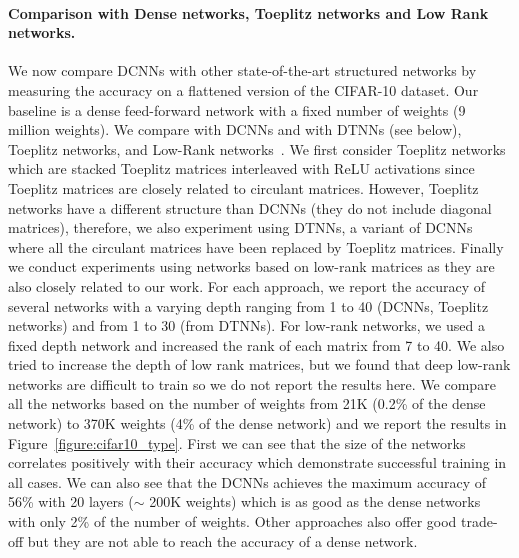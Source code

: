 \paragraph{Comparison with Dense networks, Toeplitz networks and Low Rank networks.}
We now compare DCNNs with other state-of-the-art structured networks by measuring the accuracy on a flattened version of the CIFAR-10 dataset.
Our baseline is a dense feed-forward network with a fixed number of weights (9 million weights).
We compare with DCNNs and with DTNNs (see below), Toeplitz networks, and Low-Rank networks~\cite{8099498}.
We first consider Toeplitz networks which are stacked Toeplitz matrices interleaved with ReLU activations since Toeplitz matrices are closely related to circulant matrices.
However, Toeplitz networks have a different structure than DCNNs (they do not include diagonal matrices), therefore, we also experiment using DTNNs, a variant of DCNNs where all the circulant matrices have been replaced by Toeplitz matrices.
Finally we conduct experiments using networks based on low-rank matrices as they are also closely related to our work.
For each approach, we report the accuracy of several networks with a varying depth ranging from 1 to 40 (DCNNs, Toeplitz networks) and from 1 to 30 (from DTNNs).
For low-rank networks, we used a fixed depth network and increased the rank of each matrix from 7 to 40.
We also tried to increase the depth of low rank matrices, but we found that deep low-rank networks are difficult to train so we do not report the results here.
We compare all the networks based on the number of weights from 21K (0.2\% of the dense network) to 370K weights (4\% of the dense network) and we report the results in Figure~\ref{figure:cifar10_type}. 
First we can see that the size of the networks correlates positively with their accuracy which demonstrate successful training in all cases.
We can also see that the DCNNs achieves the maximum accuracy of 56\% with 20 layers ($\sim$ 200K weights) which is as good as the dense networks with only 2\% of the number of weights.
Other approaches also offer good trade-off but they are not able to reach the accuracy of a dense network.


